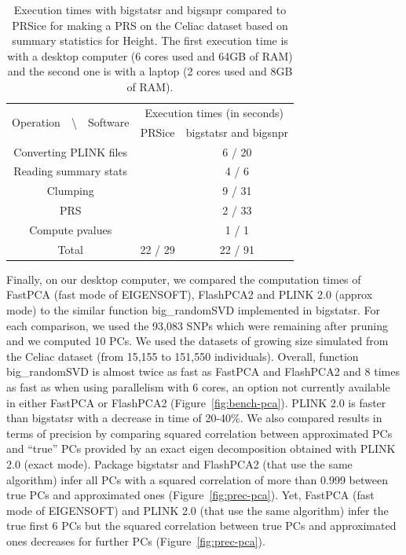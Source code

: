 \documentclass{bioinfo}
\begin{document}
\begin{table}[!tpb]
\begin{center}
\begin{adjustbox}{max width=235pt}
\begin{tabular}{|c|c|c|}
\hline
\multirow{2}{*}{Operation~~\textbackslash~~Software} &   \multicolumn{2}{c|}{Execution times (in seconds)} \\
 \cline{2-3}
 & PRSice & bigstatsr and bigsnpr \\
\hline
Converting PLINK files   &  & 6 / 20 \\
Reading summary stats &  & 4 / 6  \\
Clumping              &  & 9 / 31 \\
PRS                   &  & 2 / 33 \\
Compute pvalues       &  & 1 / 1  \\
\hline
Total                 & 22 / 29 & 22 / 91 \\
\hline
\end{tabular} 
\end{adjustbox}
\end{center}
\caption{Execution times with bigstatsr and bigsnpr compared to PRSice for making a PRS on the Celiac dataset based on summary statistics for Height. The first execution time is with a desktop computer (6 cores used and 64GB of RAM) and the second one is with a laptop (2 cores used and 8GB of RAM).}
\label{tab:bench-prs}
\end{table}

Finally, on our desktop computer, we compared the computation times of FastPCA (fast mode of EIGENSOFT), FlashPCA2 and PLINK 2.0 (approx mode) to the similar function big\_randomSVD implemented in bigstatsr. For each comparison, we used the 93,083 SNPs which were remaining after pruning and we computed 10 PCs. We used the datasets of growing size simulated from the Celiac dataset (from 15,155 to 151,550 individuals). Overall, function  big\_randomSVD is almost twice as fast as FastPCA and FlashPCA2 and 8 times as fast as when using parallelism with 6 cores, an option not currently available in either FastPCA or FlashPCA2 (Figure~\ref{fig:bench-pca}). PLINK 2.0 is faster than bigstatsr with a decrease in time of 20-40\%. 
We also compared results in terms of precision by comparing squared correlation between approximated PCs and ``true'' PCs provided by an exact eigen decomposition obtained with PLINK 2.0 (exact mode). 
Package bigstatsr and FlashPCA2 (that use the same algorithm) infer all PCs with a squared correlation of more than 0.999 between true PCs and approximated ones (Figure~\ref{fig:prec-pca}). Yet, FastPCA (fast mode of EIGENSOFT) and PLINK 2.0 (that use the same algorithm) infer the true first 6 PCs but the squared correlation between true PCs and approximated ones decreases for further PCs (Figure~\ref{fig:prec-pca}).   
\end{document}
